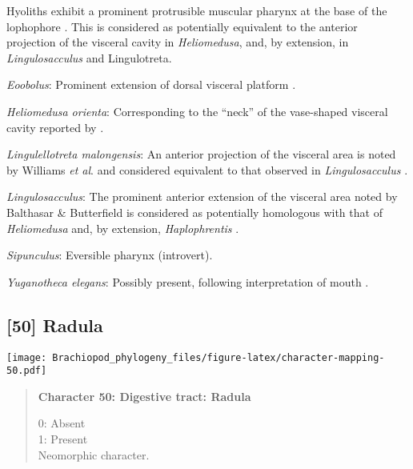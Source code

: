 \documentclass[openany]{book}
\theoremstyle{definition}
\theoremstyle{definition}
\theoremstyle{definition}
\theoremstyle{remark}
\begin{document}
Hyoliths exhibit a prominent protrusible muscular pharynx at the base of
the lophophore \citep{Moysiuk2017Hyolithsare}. This is considered as
potentially equivalent to the anterior projection of the visceral cavity
in \emph{Heliomedusa}, and, by extension, in \emph{Lingulosacculus} and
Lingulotreta.

\hypertarget{Eoobolus-coding-49}{}
\emph{Eoobolus}: Prominent extension of dorsal visceral platform
\citep{Balthasar2009Thebrachiopod}.

\hypertarget{Heliomedusa_orienta-coding-49}{}
\emph{Heliomedusa orienta}: Corresponding to the ``neck'' of the
vase-shaped visceral cavity reported by
\citet{Zhang2009Architectureand}.

\hypertarget{Lingulellotreta_malongensis-coding-49}{}
\emph{Lingulellotreta malongensis}: An anterior projection of the
visceral area is noted by Williams \emph{et al}.
\citeyearpar{Williams2000LinguliformeaCraniiformea} and considered
equivalent to that observed in \emph{Lingulosacculus}
\citep{Balthasar2009EarlyCambrian}.

\hypertarget{Lingulosacculus-coding-49}{}
\emph{Lingulosacculus}: The prominent anterior extension of the visceral
area noted by Balthasar \& Butterfield
\citeyearpar{Balthasar2009EarlyCambrian} is considered as potentially
homologous with that of \emph{Heliomedusa}
\citep{Zhang2009Architectureand} and, by extension, \emph{Haplophrentis}
\citep{Moysiuk2017Hyolithsare}.

\hypertarget{Sipunculus-coding-49}{}
\emph{Sipunculus}: Eversible pharynx (introvert).

\hypertarget{Yuganotheca_elegans-coding-49}{}
\emph{Yuganotheca elegans}: Possibly present, following interpretation
of mouth \citep[see fig. 2c, d in][]{Zhang2014Anearly}.

\subsection*{{[}50{]} Radula}\label{radula}

\texttt{[image: Brachiopod\_phylogeny\_files/figure-latex/character-mapping-50.pdf]}

\begin{quote}
\textbf{Character 50: Digestive tract: Radula}

0: Absent\\
1: Present\\
Neomorphic character.
\end{quote}
\end{document}
